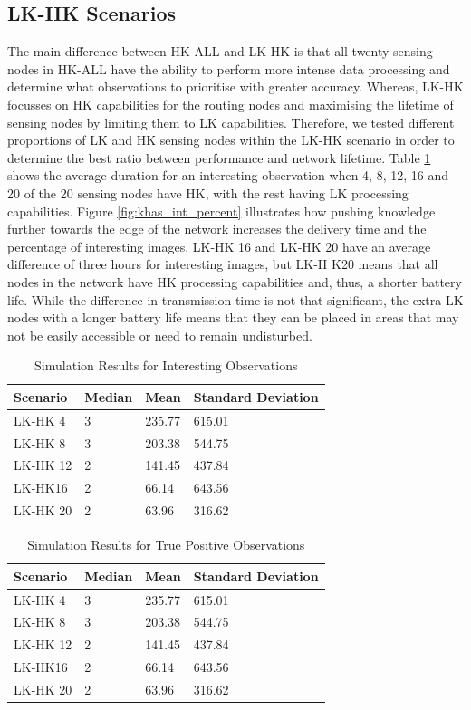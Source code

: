 \subsection{LK-HK Scenarios}

The main difference between HK-ALL and LK-HK is that all twenty sensing nodes in HK-ALL have the ability to perform more intense data processing and determine what observations to prioritise with greater accuracy. Whereas, LK-HK focusses on HK capabilities for the routing nodes and maximising the lifetime of sensing nodes by limiting them to LK capabilities. Therefore, we tested different proportions of LK and HK sensing nodes within the LK-HK scenario in order to determine the best ratio between performance and network lifetime. Table \ref{tab:khas_int} shows the average duration for an interesting observation when 4, 8, 12, 16 and 20 of the 20 sensing nodes have HK, with the rest having LK processing capabilities. Figure \ref{fig:khas_int_percent} illustrates how pushing knowledge further towards the edge of the network increases the delivery time and the percentage of interesting images. LK-HK 16 and LK-HK 20 have an average difference of three hours for interesting images, but LK-H K20 means that all nodes in the network have HK processing capabilities and, thus, a shorter battery life. While the difference in transmission time is not that significant, the extra LK nodes with a longer battery life means that they can be placed in areas that may not be easily accessible or need to remain undisturbed.

\begin{table}[h]\footnotesize
\begin{tabularx}{\textwidth}{ |X|X|X|X|}
\hline
Scenario & Median & Mean & Standard Deviation \\
\hline
LK-HK 4 & 3 & 235.77 & 615.01 \\
LK-HK 8 & 3 & 203.38 & 544.75 \\
LK-HK 12 & 2 & 141.45 & 437.84 \\
LK-HK16 & 2 & 66.14 & 643.56 \\
LK-HK 20 & 2 & 63.96 & 316.62 \\
\hline
\end{tabularx}
\caption{Simulation Results for Interesting Observations}\label{tab:khas_int}
\end{table}

\begin{table}[h]\footnotesize
\begin{tabularx}{\textwidth}{ |X|X|X|X|}
\hline
Scenario & Median & Mean & Standard Deviation \\
\hline
LK-HK 4 & 3 & 235.77 & 615.01 \\
LK-HK 8 & 3 & 203.38 & 544.75 \\
LK-HK 12 & 2 & 141.45 & 437.84 \\
LK-HK16 & 2 & 66.14 & 643.56 \\
LK-HK 20 & 2 & 63.96 & 316.62 \\
\hline
\end{tabularx}
\caption{Simulation Results for True Positive Observations}\label{tab:khas_tp}
\end{table}

